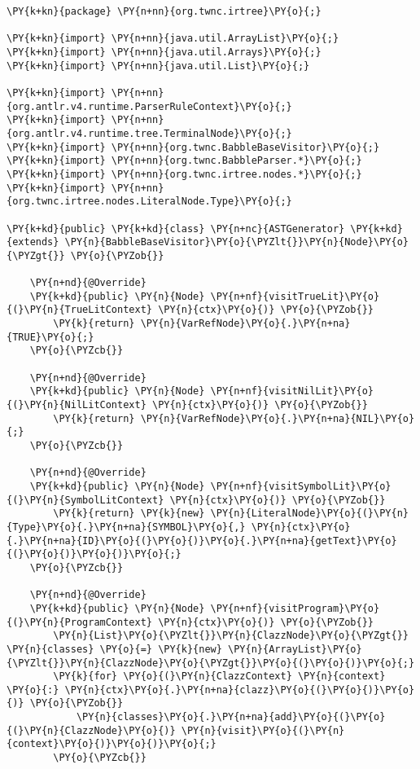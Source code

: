 \begin{Verbatim}[commandchars=\\\{\}]
\PY{k+kn}{package} \PY{n+nn}{org.twnc.irtree}\PY{o}{;}

\PY{k+kn}{import} \PY{n+nn}{java.util.ArrayList}\PY{o}{;}
\PY{k+kn}{import} \PY{n+nn}{java.util.Arrays}\PY{o}{;}
\PY{k+kn}{import} \PY{n+nn}{java.util.List}\PY{o}{;}

\PY{k+kn}{import} \PY{n+nn}{org.antlr.v4.runtime.ParserRuleContext}\PY{o}{;}
\PY{k+kn}{import} \PY{n+nn}{org.antlr.v4.runtime.tree.TerminalNode}\PY{o}{;}
\PY{k+kn}{import} \PY{n+nn}{org.twnc.BabbleBaseVisitor}\PY{o}{;}
\PY{k+kn}{import} \PY{n+nn}{org.twnc.BabbleParser.*}\PY{o}{;}
\PY{k+kn}{import} \PY{n+nn}{org.twnc.irtree.nodes.*}\PY{o}{;}
\PY{k+kn}{import} \PY{n+nn}{org.twnc.irtree.nodes.LiteralNode.Type}\PY{o}{;}

\PY{k+kd}{public} \PY{k+kd}{class} \PY{n+nc}{ASTGenerator} \PY{k+kd}{extends} \PY{n}{BabbleBaseVisitor}\PY{o}{\PYZlt{}}\PY{n}{Node}\PY{o}{\PYZgt{}} \PY{o}{\PYZob{}}

    \PY{n+nd}{@Override}
    \PY{k+kd}{public} \PY{n}{Node} \PY{n+nf}{visitTrueLit}\PY{o}{(}\PY{n}{TrueLitContext} \PY{n}{ctx}\PY{o}{)} \PY{o}{\PYZob{}}
        \PY{k}{return} \PY{n}{VarRefNode}\PY{o}{.}\PY{n+na}{TRUE}\PY{o}{;}
    \PY{o}{\PYZcb{}}

    \PY{n+nd}{@Override}
    \PY{k+kd}{public} \PY{n}{Node} \PY{n+nf}{visitNilLit}\PY{o}{(}\PY{n}{NilLitContext} \PY{n}{ctx}\PY{o}{)} \PY{o}{\PYZob{}}
        \PY{k}{return} \PY{n}{VarRefNode}\PY{o}{.}\PY{n+na}{NIL}\PY{o}{;}
    \PY{o}{\PYZcb{}}

    \PY{n+nd}{@Override}
    \PY{k+kd}{public} \PY{n}{Node} \PY{n+nf}{visitSymbolLit}\PY{o}{(}\PY{n}{SymbolLitContext} \PY{n}{ctx}\PY{o}{)} \PY{o}{\PYZob{}}
        \PY{k}{return} \PY{k}{new} \PY{n}{LiteralNode}\PY{o}{(}\PY{n}{Type}\PY{o}{.}\PY{n+na}{SYMBOL}\PY{o}{,} \PY{n}{ctx}\PY{o}{.}\PY{n+na}{ID}\PY{o}{(}\PY{o}{)}\PY{o}{.}\PY{n+na}{getText}\PY{o}{(}\PY{o}{)}\PY{o}{)}\PY{o}{;}
    \PY{o}{\PYZcb{}}

    \PY{n+nd}{@Override}
    \PY{k+kd}{public} \PY{n}{Node} \PY{n+nf}{visitProgram}\PY{o}{(}\PY{n}{ProgramContext} \PY{n}{ctx}\PY{o}{)} \PY{o}{\PYZob{}}
        \PY{n}{List}\PY{o}{\PYZlt{}}\PY{n}{ClazzNode}\PY{o}{\PYZgt{}} \PY{n}{classes} \PY{o}{=} \PY{k}{new} \PY{n}{ArrayList}\PY{o}{\PYZlt{}}\PY{n}{ClazzNode}\PY{o}{\PYZgt{}}\PY{o}{(}\PY{o}{)}\PY{o}{;}
        \PY{k}{for} \PY{o}{(}\PY{n}{ClazzContext} \PY{n}{context} \PY{o}{:} \PY{n}{ctx}\PY{o}{.}\PY{n+na}{clazz}\PY{o}{(}\PY{o}{)}\PY{o}{)} \PY{o}{\PYZob{}}
            \PY{n}{classes}\PY{o}{.}\PY{n+na}{add}\PY{o}{(}\PY{o}{(}\PY{n}{ClazzNode}\PY{o}{)} \PY{n}{visit}\PY{o}{(}\PY{n}{context}\PY{o}{)}\PY{o}{)}\PY{o}{;}
        \PY{o}{\PYZcb{}}


\end{Verbatim}
